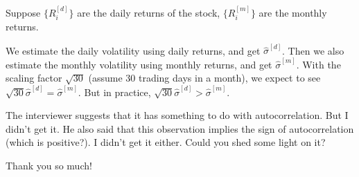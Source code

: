 \documentclass[a4paper, 10pt]{article}
\theoremstyle{definition}
\theoremstyle{hSol}
\begin{document}
Suppose $\{R_i^{[d]}\}$ are the daily returns of the stock, $\{R_{i}^{[m]}\}$ are the monthly returns. 

We estimate the daily volatility using daily returns, and get $\hat{\sigma}^{[d]}$. Then we also estimate the monthly volatility using monthly returns, and get $\hat{\sigma}^{[m]}$. With the scaling factor $\sqrt{30}$ (assume 30 trading days in a month), we expect to see $\sqrt{30}\hat{\sigma}^{[d]} = \hat{\sigma}^{[m]}$. But in practice, $\sqrt{30}\hat{\sigma}^{[d]} > \hat{\sigma}^{[m]}$.

The interviewer suggests that it has something to do with autocorrelation. But I didn't get it. He also said that this observation implies the sign of autocorrelation (which is positive?). I didn't get it either. Could you shed some light on it?

Thank you so much!
\end{document}
